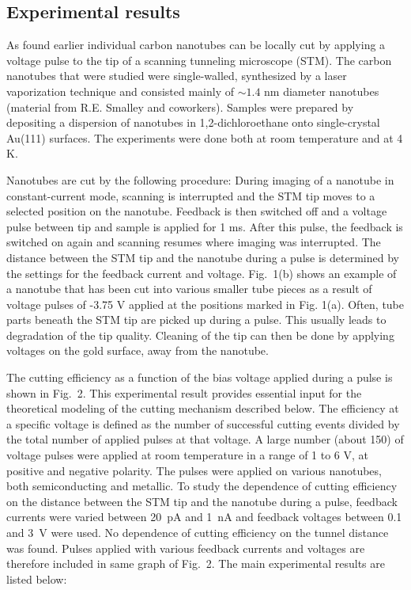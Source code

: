 \begin{multicols}{2}
\section{Experimental results}

As found earlier \cite{Venema} individual carbon nanotubes can be
locally cut by applying a voltage pulse to the tip of a scanning
tunneling microscope (STM). The carbon nanotubes that were studied
were single-walled, synthesized by a laser vaporization technique
and consisted mainly of $\sim 1.4$ nm diameter nanotubes (material
from R.E. Smalley and coworkers)\cite{Smalley}. Samples were
prepared by depositing a dispersion of nanotubes in
1,2-dichloroethane onto single-crystal Au(111) surfaces. The
experiments were done both at room temperature and at 4 K.

Nanotubes are cut by the following procedure: During imaging of a
nanotube in constant-current mode, scanning is interrupted and the
STM tip moves to a selected position on the nanotube. Feedback is
then switched off and a voltage pulse between tip and sample is
applied for 1 ms. After this pulse, the feedback is switched on
again and scanning resumes where imaging was interrupted. The
distance between the STM tip and the nanotube during a pulse is
determined by the settings for the feedback current and voltage.
Fig.~1(b) shows an example of a nanotube that has been cut into
various smaller tube pieces as a result of voltage pulses of -3.75
V applied at the positions marked in Fig. 1(a). Often, tube parts
beneath the STM tip are picked up during a pulse. This usually
leads to degradation of the tip quality. Cleaning of the tip can
then be done by applying voltages on the gold surface, away from
the nanotube.

The cutting efficiency as a function of the bias voltage applied
during a pulse is shown in Fig.~2. This experimental result
provides essential input for the theoretical modeling of the
cutting mechanism described below. The efficiency at a specific
voltage is defined as the number of successful cutting events
divided by the total number of applied pulses at that voltage. A
large number (about 150) of voltage pulses were applied at room
temperature in a range of 1 to 6 V, at positive and negative
polarity. The pulses were applied on various nanotubes, both
semiconducting and metallic. To study the dependence of cutting
efficiency on the distance between the STM tip and the nanotube
during a pulse, feedback currents were varied between 20~pA and
1~nA and feedback voltages between 0.1 and 3~V were used. No
dependence of cutting efficiency on the tunnel distance was found.
Pulses applied with various feedback currents and voltages are
therefore included in same graph of Fig.~2. The main experimental
results are listed below:


\end{multicols}
